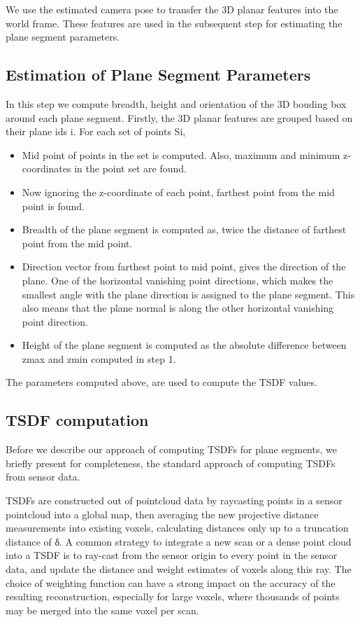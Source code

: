 We use the estimated camera pose to transfer the 3D planar features into the world frame. These features are used in the subsequent step for estimating the plane segment parameters.

\subsection{Estimation of Plane Segment Parameters}
In this step we compute breadth, height and orientation of the 3D bouding box around each plane segment. Firstly, the 3D planar features are grouped based on their plane ids i. For each set of points Si, 
\begin{itemize}
\item Mid point of points in the set is computed. Also, maximum and minimum z-coordinates in the point set are found.
\item Now ignoring the z-coordinate of each point, farthest point from the mid point is found. 
\item Breadth of the plane segment is computed as, twice the distance of farthest point from the mid point.
\item Direction vector from farthest point to mid point, gives the direction of the plane. One of the horizontal vanishing point directions, which makes the smallest angle with the plane direction is assigned to the plane segment. This also means that the plane normal is along the other horizontal vanishing point direction.
\item Height of the plane segment is computed as the absolute difference between zmax and zmin computed in step 1.
\end{itemize}

The parameters computed above, are used to compute the TSDF values.

\subsection{TSDF computation}
Before we describe our approach of computing TSDFs for plane segments, we briefly present for completeness, the standard approach of computing TSDFs from sensor data.

TSDFs are constructed out of pointcloud data by raycasting points in a sensor pointcloud into a global map, then averaging the new projective distance measurements into existing voxels, calculating distances only up to a truncation distance of δ. A common strategy to integrate a new scan or a dense point cloud into a TSDF is to ray-cast from the sensor origin to every point in the sensor data, and update the distance and weight estimates of voxels along this ray. The choice of weighting function can have a strong impact on the accuracy of the resulting reconstruction, especially for large voxels, where thousands of points may be merged into the same voxel per scan.

